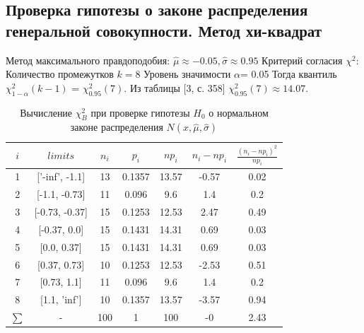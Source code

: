 \documentclass[a4paper,14pt]{article}
\begin{document}
	\subsection{Проверка гипотезы о законе распределения генеральной совокупности. Метод хи-квадрат}
	
	\noindent Метод максимального правдоподобия:
	\newline
	$\hat{\mu} \approx -0.05, \hat{\sigma} \approx 0.95$
	\newline
	Критерий согласия $\chi^{2}$:
	\newline
	Количество промежутков $k = 8$
	\newline
	Уровень значимости $\alpha$= 0.05
	\newline
	Тогда квантиль $\chi^{2}_{1-\alpha}(k-1)$ = $\chi^{2}_{0.95}(7)$. Из таблицы [3, с. 358] $\chi^{2}_{0.95}(7) \approx 14.07$. 
	\begin{table}[H]
		\centering
		\begin{tabular}{| c | c | c | c | c | c | c |}
			\hline
			$i$ & $limits$         &   $n_i$ &    $p_i$ &   $np_i$ &   $n_i - np_i$ &   $\frac{(n_i-np_i)^2}{np_i}$ \\
			\hline
			1 & ['-inf', -1.1] &    13 & 0.1357 &  13.57 &        -0.57 &                        0.02 \\
			2 & [-1.1, -0.73]  &    11 & 0.096  &   9.6  &         1.4  &                        0.2  \\
			3 & [-0.73, -0.37] &    15 & 0.1253 &  12.53 &         2.47 &                        0.49 \\
			4 & [-0.37, 0.0]   &    15 & 0.1431 &  14.31 &         0.69 &                        0.03 \\
			5 & [0.0, 0.37]    &    15 & 0.1431 &  14.31 &         0.69 &                        0.03 \\
			6 & [0.37, 0.73]   &    10 & 0.1253 &  12.53 &        -2.53 &                        0.51 \\
			7 & [0.73, 1.1]    &    11 & 0.096  &   9.6  &         1.4  &                        0.2  \\
			8 & [1.1, 'inf']   &    10 & 0.1357 &  13.57 &        -3.57 &                        0.94 \\
			$\sum$ & -              &   100 & 1      & 100    &        -0    &                        2.43 \\
			\hline
		\end{tabular}
		\caption{ Вычисление $\chi^{2}_{B}$ при проверке гипотезы $H_{0}$ о нормальном законе распределения $N(x,\hat{\mu}, \hat{\sigma})$}
		\label{tab:normal_chi_2}
	\end{table} 
	
\end{document}
